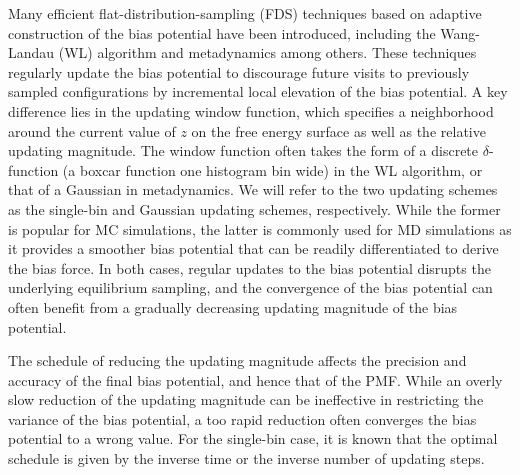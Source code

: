 \documentclass[reprint, superscriptaddress, floatfix]{revtex4-1}
\begin{document}
Many efficient flat-distribution-sampling (FDS) techniques
based on adaptive construction of the bias potential
have been introduced,
including the Wang-Landau (WL) algorithm\cite{
  wang2001, wang2001pre}
and metadynamics\cite{huber1994,
  *laio2002, *laio2008, *barducci2011, *sutto2012, micheletti2004}
among others\cite{yan2004, kim2006, *kim2007, kim2010, junghans2014,
  langfeld2012, pellegrini2014,
  maragliano2006, *abrams2008,
  zheng2010}.
%
These techniques regularly update the bias potential
to discourage future visits to previously sampled configurations
by incremental local elevation of the bias potential.
%
A key difference lies
in the updating window function,
which specifies
a neighborhood around the current value of
$z$ on the free energy surface
as well as the relative updating magnitude.
%
The window function often
takes the form of a discrete
$\delta$-function (a boxcar function one histogram bin wide)
in the WL algorithm,
or that of a Gaussian
in metadynamics.\cite{junghans2014}
%
We will refer to the two updating schemes
as the single-bin
and Gaussian updating schemes, respectively.
%
While the former is popular for MC simulations,\cite{wang2001,
  wang2001pre, kim2006, *kim2007}
the latter is commonly used for MD simulations
as it provides a smoother bias potential
that can be readily differentiated
to derive the bias force.\cite{huber1994,
  *laio2002, *laio2008, *barducci2011, *sutto2012, junghans2014}
%
In both cases,
regular updates to the bias potential
disrupts the underlying equilibrium
sampling,\cite{zhou2005, morozov2007, zhou2008}
and the convergence of the bias potential
can often benefit from a gradually decreasing
updating magnitude of the bias potential.



The schedule of reducing the updating magnitude
affects the precision and accuracy
of the final bias potential,
and hence that of the PMF.\cite{
belardinelli2007, *belardinelli2007jcp, *belardinelli2008, *belardinelli2016,
liang2007,
morozov2007, morozov2009, zhou2008,
komura2012, *caparica2012, *caparica2014,
min2007,
barducci2008, dickson2011, dama2014, poulain2006}
%
While an overly slow reduction of the updating magnitude
can be ineffective in restricting the variance of the bias potential,
a too rapid reduction often
converges the bias potential to a wrong value.
%
For the single-bin case, it is known that
the optimal schedule is given by the
inverse time\cite{
belardinelli2007, *belardinelli2007jcp, *belardinelli2008, *belardinelli2016,
liang2007,
morozov2007, morozov2009, zhou2008}
or
the inverse number of updating steps.
\end{document}
